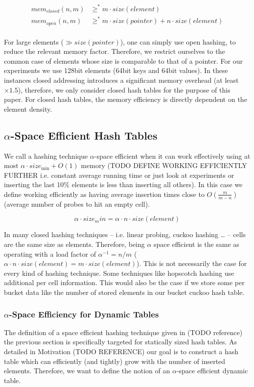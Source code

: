 \documentclass[a4paper,UKenglish]{lipics-v2016}
\begin{document}
\begin{align*}
  mem_{closed}(n,m) &\geq^* m\cdot size(element)\\
  mem_{open}  (n,m) &\geq^* m\cdot size(pointer) + n\cdot size(element)\\
\end{align*}

For large elements ($\gg size(pointer)$), one can simply use open
hashing, to reduce the relevant memory factor.  Therefore, we restrict
ourselves to the common case of elements whose size is comparable to
that of a pointer.  For our experiments we use 128bit elements (64bit
keys and 64bit values).  In these instances closed addressing
introduces a significant memory overhead (at least $\times1.5$),
therefore, we only consider closed hash tables for the purpose of this
paper. For closed hash tables, the memory efficiency is directly
dependent on the element density.

\subsection{$\alpha$-Space Efficient Hash Tables}
We call a hashing technique $\alpha$-space efficient when it can
work effectively using at most $\alpha \cdot size_{\min} + O(1)$
memory (TODO DEFINE WORKING EFFICIENTLY FURTHER i.e. constant average
running time or just look at experiments or inserting the last 10\%
elements is less than inserting all others). In this case we define
working efficiently as having average insertion times close to
$O(\frac{m}{m-n})$ (average number of probes to hit an empty cell).

\[\alpha \cdot size_min = \alpha\cdot n\cdot size(element)\]

In many closed hashing techniques -- i.e. linear probing, cuckoo
hashing \ldots{} -- cells are the same size as elements. Therefore, being
$\alpha$ space efficient is the same as operating with a load factor
of $\alpha^{-1} = n/m$ ($\alpha\cdot n \cdot size(element) = m\cdot
size(element)$).  This is not necessarily the case for every kind of
hashing technique.  Some techniques like hopscotch hashing use
additional per cell information.  This would also be the case if we
store some per bucket data like the number of stored elements in our
bucket cuckoo hash table.

\subsubsection*{$\alpha$-Space Efficiency for Dynamic Tables}
The definition of a space efficient hashing technique given in (TODO
reference) the previous section is specifically targeted for
statically sized hash tables.  As detailed in Motivation (TODO
REFERENCE) our goal is to construct a hash table which can efficiently
(and tightly) grow with the number of inserted elements. Therefore, we
want to define the notion of an $\alpha$-space efficient dynamic
table.
\end{document}
